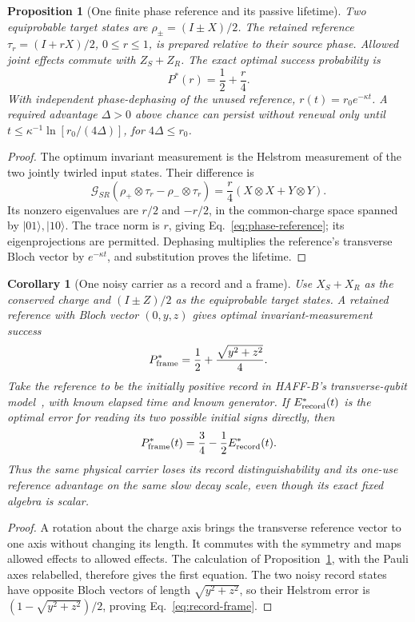 \documentclass[12pt]{article}
\newtheorem{proposition}[theorem]{Proposition}
\newtheorem{corollary}[theorem]{Corollary}
\theoremstyle{definition}
\begin{document}
\begin{proposition}[One finite phase reference and its passive lifetime]
\label{prop:phase-reference}
Two equiprobable target states are $\rho_\pm=(I\pm X)/2$.
The retained reference $\tau_r=(I+rX)/2$, $0\le r\le1$, is prepared
relative to their source phase. Allowed joint effects commute with
$Z_S+Z_R$. The exact optimal success probability is
\begin{equation}\label{eq:phase-reference}
 P^*(r)=\frac12+\frac r4.
\end{equation}
With independent phase-dephasing of the unused reference,
$r(t)=r_0e^{-\kappa t}$. A required advantage $\Delta>0$ above chance
can persist without renewal only until
$t\le\kappa^{-1}\ln[r_0/(4\Delta)]$, for $4\Delta\le r_0$.
\end{proposition}
\begin{proof}
The optimum invariant measurement is the Helstrom measurement of the two
jointly twirled input states. Their difference is
\[
 \mathcal G_{SR}(\rho_+\otimes\tau_r-\rho_-\otimes\tau_r)
 =\frac r4(X\otimes X+Y\otimes Y).
\]
Its nonzero eigenvalues are $r/2$ and $-r/2$, in the common-charge
space spanned by $|01\rangle,|10\rangle$. The trace norm is $r$,
giving Eq.~\eqref{eq:phase-reference}; its eigenprojections are permitted.
Dephasing multiplies the reference's transverse Bloch vector by
$e^{-\kappa t}$, and substitution proves the lifetime.
\end{proof}

\begin{corollary}[One noisy carrier as a record and a frame]
\label{cor:record-frame}
Use $X_S+X_R$ as the conserved charge and $(I\pm Z)/2$ as the
equiprobable target states. A retained reference with Bloch vector
$(0,y,z)$ gives optimal invariant-measurement success
\[
 P_{\rm frame}^*=\frac12+\frac{\sqrt{y^2+z^2}}4.
\]
Take the reference to be the initially positive record in HAFF-B's
transverse-qubit model~\cite{Liu2026HAFF_B}, with known elapsed time
and known generator. If $E_{\rm record}^*(t)$ is the optimal error for
reading its two possible initial signs directly, then
\begin{equation}\label{eq:record-frame}
 P_{\rm frame}^*(t)=\frac34-\frac12E_{\rm record}^*(t).
\end{equation}
Thus the same physical carrier loses its record distinguishability
and its one-use reference advantage on the same slow decay scale,
even though its exact fixed algebra is scalar.
\end{corollary}
\begin{proof}
A rotation about the charge axis brings the transverse reference vector
to one axis without changing its length. It commutes with the symmetry
and maps allowed effects to allowed effects. The calculation of
Proposition~\ref{prop:phase-reference}, with the Pauli axes relabelled,
therefore gives the first equation. The two noisy record states have
opposite Bloch vectors of length $\sqrt{y^2+z^2}$, so their Helstrom
error is $(1-\sqrt{y^2+z^2})/2$, proving
Eq.~\eqref{eq:record-frame}.
\end{proof}
\end{document}

